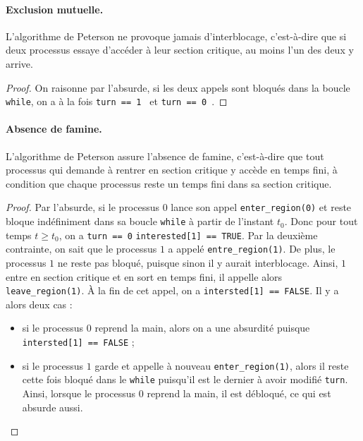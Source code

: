 \paragraph{Exclusion mutuelle.}
\begin{proposition}
L'algorithme de Peterson ne provoque jamais d'interblocage, c'est-à-dire que si deux processus essaye d’accéder à leur section critique, au moins l'un des deux y arrive.
\end{proposition}

\begin{proof}
On raisonne par l'absurde, si les deux appels sont bloqués dans la boucle \texttt{while}, on a à la fois \texttt{turn == 1 } et \texttt{turn == 0 }.
\end{proof}


\paragraph{Absence de famine.}

\begin{proposition}
L'algorithme de Peterson assure l'absence de famine, c'est-à-dire que tout processus qui demande à rentrer en section critique y accède en temps fini, à condition que chaque processus reste un temps fini dans sa section critique.
\end{proposition}

\begin{proof}
Par l'absurde, si le processus $0$ lance son appel \texttt{enter\_region(0)} et reste bloque indéfiniment dans sa boucle \texttt{while} à partir de l'instant $t_0$. Donc pour tout temps $t\geq t_0$, on a \texttt{turn == 0} \texttt{interested[1] == TRUE}. Par la deuxième contrainte, on sait que le processus $1$ a appelé \texttt{entre\_region(1)}. De plus, le processus $1$ ne reste pas bloqué, puisque sinon il y aurait interblocage. Ainsi, $1$ entre en section critique et en sort en temps fini, il appelle alors {\tt leave\_region(1)}. À la fin de cet appel, on a {\tt intersted[1] == FALSE}. 
Il y a alors deux cas :
\begin{itemize}
\item si le processus $0$ reprend la main, alors on a une absurdité puisque {\tt intersted[1] == FALSE} ;
\item si le processus $1$ garde et appelle à nouveau {\tt enter\_region(1)}, alors il reste cette fois bloqué dans le {\tt while} puisqu'il est le dernier à avoir modifié {\tt turn}. Ainsi, lorsque le processus $0$ reprend la main, il est débloqué, ce qui est absurde aussi.
\end{itemize}
\end{proof}


